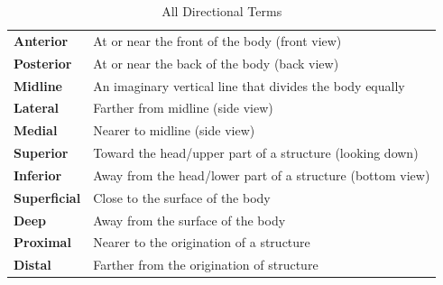 \begin{table}[H]
	\centering

	\begin{tabular}{ll}
		\textbf{Anterior}    & At or near the front of the body (front view)              \\
		\textbf{Posterior}   & At or near the back of the body (back view)                \\
		\textbf{Midline}     & An imaginary vertical line that divides the body equally   \\
		\textbf{Lateral}     & Farther from midline (side view)                           \\
		\textbf{Medial}      & Nearer to midline (side view)                              \\
		\textbf{Superior}    & Toward the head/upper part of a structure (looking down)   \\
		\textbf{Inferior}    & Away from the head/lower part of a structure (bottom view) \\
		\textbf{Superficial} & Close to the surface of the body                           \\
		\textbf{Deep}        & Away from the surface of the body                          \\
		\textbf{Proximal}    & Nearer to the origination of a structure                   \\
		\textbf{Distal}      & Farther from the origination of structure
	\end{tabular}

	\caption{All Directional Terms}
	\label{tab:all_directional_terms}
\end{table}



\newpage
